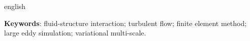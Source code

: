 \begin{resumo}[Abstract]
\begin{otherlanguage*}{english}
		\vspace{\onelineskip}

		\noindent
		\textbf{Keywords}: fluid-structure interaction; turbulent flow; finite element method; large eddy simulation; variational multi-scale.
	\end{otherlanguage*}
\end{resumo}
